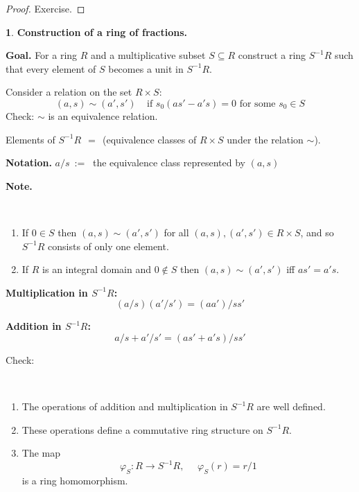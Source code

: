 \documentclass[12pt, letterpaper, oneside]{article}
\theoremstyle{plain}
\theoremstyle{definition}
\newtheorem{nn}[theorem]{}
\newcommand{\benu}{\begin{enumerate}}
\newcommand{\eenu}{\end{enumerate}}
\newcommand{\vs}{\vskip 5mm}
\newcommand{\isep}[1][0]{\setlength{\itemsep}{#1 mm}}
\begin{document}
 
 \vs
 
 \begin{proof}
 Exercise. 
 \end{proof}
 
 
 
 \vs\vs\vs
 
 
 
 \begin{nn}\textbf{Construction of a ring of fractions.}

 
 \textbf{Goal.} For a ring $R$ and a multiplicative subset $S\subseteq R$ construct a ring
 $S^{-1}R$ such that every element of $S$ becomes a unit in $S^{-1}R$.
 
 
 \vs
 

 
Consider  a relation on the set $R\times S$:
$$(a, s)\sim (a', s') \ \ \ \ \ \text{if  \ } s_{0}(as' - a's)=0  \text{ for some } s_{0}\in S $$
Check: $\sim$ is an equivalence relation. 

Elements of $S^{-1}R \ \ = \ \ $(equivalence classes of $R\times S$ under the relation $\sim$).  
 
\vs
 
\textbf{Notation.} $a/s \ := \ $ the equivalence class represented by $(a, s)$  
 
 \vs
  
\textbf{Note.} 

\vskip -13mm

\ 
\benu
\isep[0]
\item If $0\in S$ then $(a, s)\sim (a', s')$ for all $(a, s), (a', s')\in R\times S$, and so 
$S^{-1}R$ consists of only one element.  
\item If $R$ is an integral domain and $0\not \in S$ then $(a,s)\sim (a', s')$ iff 
$as' = a's$.
 \eenu
 
 \vs\vs
 
 \textbf{Multiplication in $S^{-1}R$:}
 $$(a/s)(a'/s') = (aa')/ss'$$
 
 
 
 
 \textbf{Addition in $S^{-1}R$:}
 $$a/s + a'/s' = (as' +a's)/ss'$$

 
 \vs
 
 Check: 

\vskip -13mm

\ 
\benu
\isep[0]
\item The operations of addition and multiplication in $S^{-1}R$ are well defined. 
\item These operations define a commutative ring structure on $S^{-1}R$.
\item The map 
$$\varphi_{S}\colon R \to S^{-1}R, \ \ \ \ \ \ \varphi_{S}(r) = r/1$$
is a ring homomorphism. 
\eenu  
 \end{nn}
 
\end{document}
